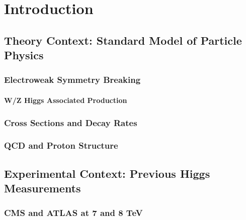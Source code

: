 \chapter{Introduction}

\section{Theory Context: Standard Model of Particle Physics}

\subsection{Electroweak Symmetry Breaking}

\subsubsection{W/Z Higgs Associated Production}

\subsection{Cross Sections and Decay Rates}

\subsection{QCD and Proton Structure}

\section{Experimental Context: Previous Higgs Measurements}


\subsection{CMS and ATLAS at 7 and 8 TeV}





